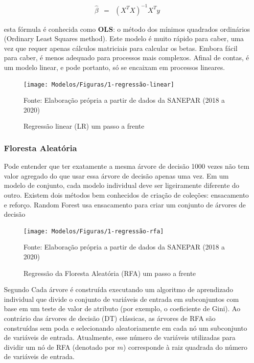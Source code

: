 \begin{eqnarray}
	\hat{\beta}&=&\left(X^T X\right)^{-1} X^T y\label{eq:ols}
\end{eqnarray}

 esta fórmula é conhecida como \textbf{OLS}: o método dos mínimos quadrados ordinários (Ordinary Least Squares method). Este modelo é muito rápido para caber, uma vez que requer apenas cálculos matriciais para calcular os betas. Embora fácil para caber, é menos adequado para processos mais complexos. Afinal de contas, é um modelo linear, e pode portanto, só se encaixam em processos lineares.

\begin{figure}[H]
	\centering
	\caption{Regressão linear (LR) um passo a frente}
	\label{fig:1-regressao-linear}
	\texttt{[image: Modelos/Figuras/1-regressão-linear]}
	
	Fonte: Elaboração própria a partir de dados da SANEPAR (2018 a 2020)
\end{figure}


\subsubsection{Floresta Aleatória} \label{subsubsec:rf}

Pode entender que ter exatamente a mesma árvore de decisão 1000 vezes não tem valor agregado do que usar essa árvore de decisão apenas uma vez.  Em um modelo de conjunto, cada modelo individual deve ser ligeiramente diferente do outro. Existem dois métodos bem conhecidos de criação de coleções: ensacamento e reforço.  Random Forest usa ensacamento para criar um conjunto de árvores de decisão

\begin{figure}[H]
	\centering
	\caption{Regressão da Floresta Aleatória (RFA) um passo a frente}
	\label{fig:1-regressao-rfa}
	\texttt{[image: Modelos/Figuras/1-regressão-rfa]}
	
	Fonte: Elaboração própria a partir de dados da SANEPAR (2018 a 2020)
\end{figure}

Segundo  Cada árvore é construída executando um algoritmo de aprendizado individual que divide o conjunto de variáveis de entrada em subconjuntos com base em um teste de valor de atributo (por exemplo, o coeficiente de Gini). Ao contrário das árvores de decisão (DT) clássicas, as árvores de RFA são construídas sem poda e selecionando aleatoriamente em cada nó um subconjunto de variáveis de entrada. Atualmente, esse número de variáveis utilizadas para dividir um nó de RFA (denotado por $m$) corresponde à raiz quadrada do número de variáveis de entrada.

